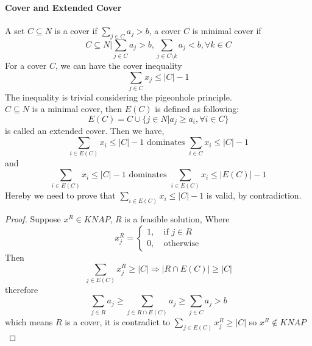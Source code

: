             \paragraph{Cover and Extended Cover}
                A set $C\subseteq N$ is a cover if $\sum_{j\in C} a_j > b$, a cover $C$ is minimal cover if
                \begin{equation*}
                    C\subseteq N | \sum_{j\in C}a_j>b, \sum_{j\in C\setminus k} a_j < b, \forall k \in C 
                \end{equation*}
                For a cover $C$, we can have the cover inequality
                \begin{equation*}
                    \sum_{j\in C}x_j \le |C|-1
                \end{equation*}
                The inequality is trivial considering the pigeonhole principle.\\
                $C\subseteq N$ is a minimal cover, then $E(C)$ is defined as following:
                \begin{equation*}
                    E(C) = C\cup \{j \in N | a_j \ge a_i, \forall i \in C\}
                \end{equation*}
                is called an extended cover. Then we have,
                \begin{equation*}
                    \sum_{i\in E(C)} x_i \le |C| - 1 \text{ dominates } \sum_{i\in C} x_i \le |C| - 1
                \end{equation*}
                and
                \begin{equation*}
                    \sum_{i\in E(C)} x_i \le |C| - 1 \text{ dominates } \sum_{i\in E(C)} x_i \le |E(C)| - 1
                \end{equation*}
                Hereby we need to prove that $\sum_{i\in E(C)} x_i \le |C| - 1$ is valid, by contradiction.\\
                \begin{proof}
                    Suppose $x^R \in KNAP$, $R$ is a feasible solution, Where
                    \begin{equation*}
                        x^R_j = \begin{cases}1, \quad \text{if $j\in R$} \\ 0, \quad \text{otherwise}\end{cases} 
                    \end{equation*}
                    Then
                    \begin{equation*}
                        \sum_{j\in E(C)}x^R_j \ge |C| \Rightarrow |R \cap E(C)| \ge |C|  
                    \end{equation*}
                    therefore
                    \begin{equation*}
                        \sum_{j\in R}a_j \ge \sum_{j\in R \cap E(C)} a_j \ge \sum_{j\in C} a_j > b 
                    \end{equation*}
                    which means $R$ is a cover, it is contradict to $\sum_{j\in E(C)}x^R_j \ge |C|$ so $x^R \notin KNAP$
                \end{proof}

